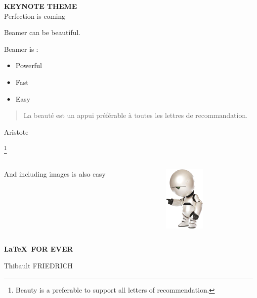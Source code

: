 \documentclass[20pt]{beamer}  %
\title{\preztitle}
\author{}
\date{}
\newcommand{\preztitle}{\bf KEYNOTE THEME}
\newcommand{\prezsubtitle}{Perfection is coming}
\renewcommand{\titlepage}{\begin{center}{\large \preztitle}\\{\color{lightgray}\small
    \prezsubtitle}\end{center}}
\begin{document}
\centering



\begin{frame}
   \titlepage 
\end{frame}


\begin{frame} %
    Beamer can be beautiful.
\end{frame}
\begin{frame} %
    Beamer is :
    \begin{itemize}
        \item <2-> Powerful
        \item <3-> Fast
        \item <4-> Easy 
\end{itemize}
\end{frame}
\begin{frame} %
    \begin{quotation}
        La beauté est un appui préférable à toutes les lettres de recommandation.
\end{quotation}
\begin{minipage}[t]{.6\textwidth}
\raggedleft%
\small Aristote
\end{minipage}\footnote{Beauty is a
    preferable to support
    all letters of
recommendation.}
\end{frame}
\begin{frame}
\end{frame}

\begin{frame}
        \begin{columns}
        \begin{column}{4cm}
            \begin{flushright}
            And including images is also easy
                
            \end{flushright}
        \end{column}
        \begin{column}{4cm}
            \vspace{-1cm}
        \includegraphics[width=2cm]{robot.png}
        \end{column}
        \end{columns}
\end{frame}

\begin{frame}
    \textbf{\large \LaTeX \ FOR EVER}

    {\tiny Thibault FRIEDRICH}
\end{frame}
\end{document}

